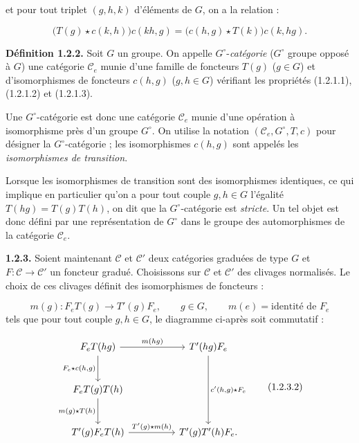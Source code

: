 %
et pour tout triplet $(g,h,k)$ d'éléments de $G$, on a la relation :

\begin{equation}
  \bigl(T(g)\star c(k,h)\bigr)c(kh,g)
  =\bigl(c(h,g)\star T(k)\bigr)c(k,hg).
  \tag{1.2.1.3}
\end{equation}

\noindent\textbf{Définition 1.2.2.}\quad
Soit $G$ un groupe. On appelle $G^\circ$-\emph{catégorie}
($G^\circ$ groupe opposé à $G$) une catégorie $\mathcal C_e$ munie d'une
famille de foncteurs $T(g)$ ($g\in G$) et d'isomorphismes de foncteurs
$c(h,g)$ ($g,h\in G$) vérifiant les propriétés (1.2.1.1), (1.2.1.2) et
(1.2.1.3).

Une $G^\circ$-catégorie est donc une catégorie $\mathcal C_e$ munie d'une
opération à isomorphisme près d'un groupe $G^\circ$. On utilise la notation
$(\mathcal C_e,G^\circ,T,c)$ pour désigner la $G^\circ$-catégorie ; les
isomorphismes $c(h,g)$ sont appelés les
\emph{isomorphismes de transition}.

Lorsque les isomorphismes de transition sont des isomorphismes identiques,
ce qui implique en particulier qu'on a pour tout couple $g,h\in G$
l'égalité $T(hg)=T(g)T(h)$, on dit que la $G^\circ$-catégorie est
\emph{stricte}. Un tel objet est donc défini par une représentation de
$G^\circ$ dans le groupe des automorphismes de la catégorie $\mathcal C_e$.

\noindent\textbf{1.2.3.}\quad
Soient maintenant $\mathcal C$ et $\mathcal C'$ deux catégories graduées de
type $G$ et $F\colon\mathcal C\to\mathcal C'$ un foncteur gradué.
Choisissons sur $\mathcal C$ et $\mathcal C'$ des clivages normalisés. Le
choix de ces clivages définit des isomorphismes de foncteurs :

\begin{equation}
  m(g)\colon F_eT(g)\longrightarrow T'(g)F_e,\qquad
  g\in G,\qquad m(e)=\text{identité de }F_e
  \tag{1.2.3.1}
\end{equation}
tels que pour tout couple $g,h\in G$, le diagramme ci-après soit
commutatif :

\begin{equation}
\begin{tikzcd}[column sep=huge,row sep=large]
F_eT(hg)
  \arrow[r,"m(hg)"]
  \arrow[d,"{F_e\star c(h,g)}",swap]
&
T^{\prime}(hg)F_e
  \arrow[dd,"{c^{\prime}(h,g)\star F_e}"]
\\
F_eT(g)T(h)
  \arrow[d,"m(g)\star T(h)",swap]
&
{}
\\
T^{\prime}(g)F_eT(h)
  \arrow[r,"T^{\prime}(g)\star m(h)"]
&
T^{\prime}(g)T^{\prime}(h)F_e\mathpunct{.}
\end{tikzcd}
\tag{1.2.3.2}
\end{equation}

